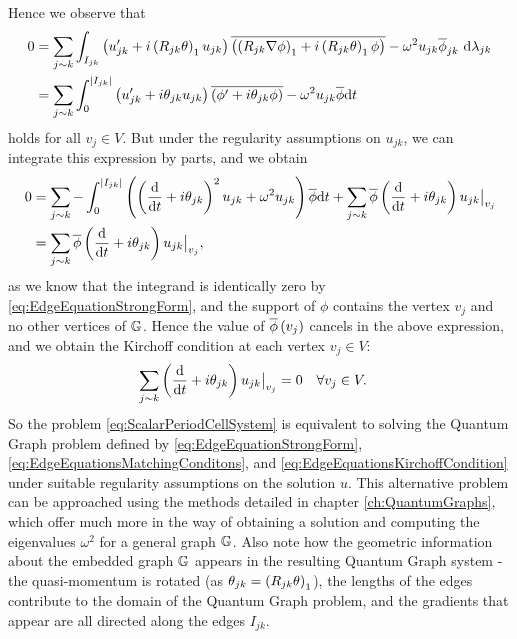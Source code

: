 Hence we observe that
\begin{align*}
	0 &= \sum_{j\sim k}\int_{I_{jk}}\left( u_{jk}' + i\left( R_{jk}\theta \right)_1 u_{jk} \right)\overline{\left( \left( R_{jk}\nabla\phi \right)_1 + i\left( R_{jk}\theta \right)_1 \phi \right)} - \omega^2 u_{jk}\overline{\phi}_{jk} \ \mathrm{d}\lambda_{jk} \\
	&= \sum_{j\sim k}\int_0^{\left\lvert I_{jk} \right\rvert} \left(  u'_{jk} + i\theta_{jk}u_{jk}  \right) \overline{\left(  \phi' + i\theta_{jk}\phi  \right)} - \omega^2 u_{jk}\overline{\phi} \mathrm{d} t
\end{align*}
holds for all $v_j\in V$.
But under the regularity assumptions on $u_{jk}$, we can integrate this expression by parts, and we obtain
\begin{align*}
	0 &= \sum_{j\sim k} -\int_0^{\left\lvert I_{jk} \right\rvert} \left( \left( \dfrac{\mathrm{d}}{\mathrm{d}t} + i\theta_{jk} \right)^2 u_{jk} + \omega^2 u_{jk} \right)\overline{\phi} \mathrm{d} t 
	+ \sum_{j\sim k}\overline{\phi}\left( \dfrac{\mathrm{d}}{\mathrm{d}t} + i\theta_{jk} \right)u_{jk}\big\vert_{v_j} \\
	&= \sum_{j\sim k}\overline{\phi}\left( \dfrac{\mathrm{d}}{\mathrm{d}t} + i\theta_{jk} \right)u_{jk}\big\vert_{v_j},
\end{align*}
as we know that the integrand is identically zero by \eqref{eq:EdgeEquationStrongForm}, and the support of $\phi$ contains the vertex $v_j$ and no other vertices of $\mathbb{G}$.
Hence the value of $\overline{\phi}\left( v_j \right)$ cancels in the above expression, and we obtain the Kirchoff condition at each vertex $v_j\in V$:
\begin{align} \label{eq:EdgeEquationsKirchoffCondition}
	\sum_{j\sim k} \left( \dfrac{\mathrm{d}}{\mathrm{d}t} + i\theta_{jk} \right)u_{jk}\big\vert_{v_j} &= 0 \quad \forall v_j\in V.
\end{align}
So the problem \eqref{eq:ScalarPeriodCellSystem} is equivalent to solving the Quantum Graph problem defined by \eqref{eq:EdgeEquationStrongForm}, \eqref{eq:EdgeEquationsMatchingConditons}, and \eqref{eq:EdgeEquationsKirchoffCondition} under suitable regularity assumptions on the solution $u$.
This alternative problem can be approached using the methods detailed in chapter \ref{ch:QuantumGraphs}, which offer much more in the way of obtaining a solution and computing the eigenvalues $\omega^2$ for a general graph $\mathbb{G}$.
Also note how the geometric information about the embedded graph $\mathbb{G}$ appears in the resulting Quantum Graph system - the quasi-momentum is rotated (as $\theta_{jk} = \left( R_{jk}\theta \right)_1$), the lengths of the edges contribute to the domain of the Quantum Graph problem, and the gradients that appear are all directed along the edges $I_{jk}$.


